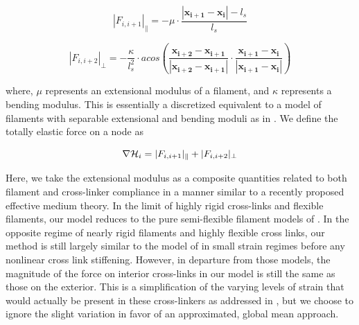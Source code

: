 \documentclass[pre,preprint]{revtex4-1}
\begin{document}
\begin{equation}
|F_{i,i+1}|_{\parallel} = -\mu\cdot\frac{|\mathbf{x_{i+1}}-\mathbf{x_i}|-l_s}{l_s} 
\end{equation}

\begin{equation}
|F_{i,i+2}|_{\perp} = -\frac{\kappa}{l_s^2}\cdot acos\left (\frac{\mathbf{x_{i+2}}-\mathbf{x_{i+1}}}{|\mathbf{x_{i+2}}-\mathbf{x_{i+1}}|} \cdot\frac{\mathbf{x_{i+1}}-\mathbf{x_i}}{|\mathbf{x_{i+1}}-\mathbf{x_i}|} \right ) 
\end{equation}


where, $\mu$ represents an extensional modulus of a filament, and $\kappa$ represents a bending modulus.   This is essentially a discretized equivalent to a model of filaments with separable extensional and bending moduli as in \cite{theo_hlm}.  We define the totally elastic force on a node as

\begin{equation}
\nabla{\cal H}_i =|F_{i,i+1}|_{\parallel} + |F_{i,i+2}|_{\perp}
\end{equation}

Here, we take the extensional modulus as a composite quantities related to both filament and cross-linker compliance in a manner similar to a recently proposed effective medium theory\cite{theo_crosslinknonlinear}.  In the limit of highly rigid cross-links and flexible filaments, our model reduces to the pure semi-flexible filament models of \cite{theo_hlm,theo_hlm2}.  In the opposite regime of nearly rigid filaments and highly flexible cross links, our method is still largely similar to the model of \cite{theo_crosslinknonlinear} in small strain regimes before any nonlinear cross link stiffening.  However, in departure from those models, the magnitude of the force on interior cross-links in our model is still the same as those on the exterior.  This is a simplification of the varying levels of strain that would actually be present in these cross-linkers as addressed in \cite{theo_crosslinknonlinear}, but we choose to ignore the slight variation in favor of an approximated, global mean approach.  

\end{document}
